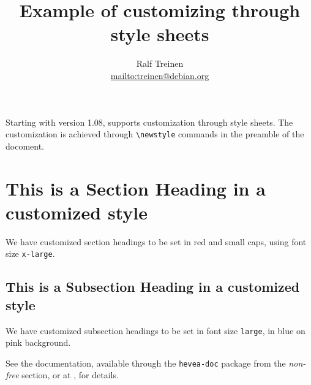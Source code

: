 \documentclass[11pt]{article}
\title{Example of customizing \hevea{} through style sheets}
\author{Ralf Treinen\\\url{mailto:treinen@debian.org}}
\begin{document}
\maketitle

Starting with version 1.08, \hevea{} supports customization through
style sheets. The customization is achieved through \verb|\newstyle|
commands in the preamble of the docoment. 

\section{This is a Section Heading in a customized style}

We have customized section headings to be set in red and small caps,
using font size \texttt{x-large}.

\subsection{This is a Subsection Heading in a customized style}

We have customized subsection headings to be set in font size
\texttt{large}, in blue on pink background.

See the documentation, available through the \verb|hevea-doc| package
from the \emph{non-free} section, or at
, for details.
\end{document}
